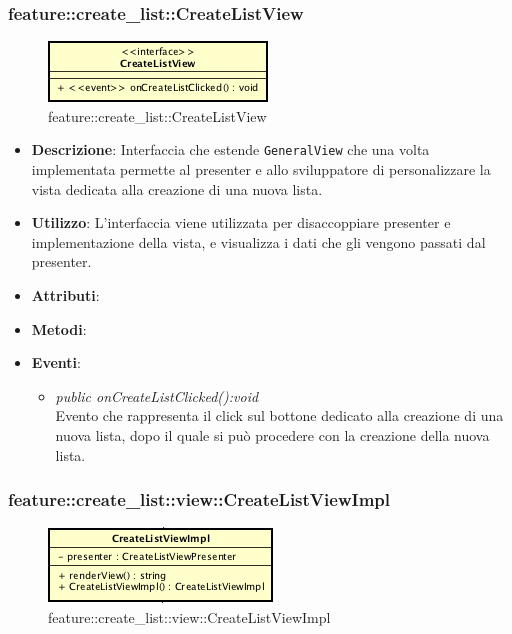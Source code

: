 \subsubsection{feature::create\_list::CreateListView}

\label{feature::create\_list::CreateListView}
\begin{figure}[ht]
	\centering
	\includegraphics[scale=0.5]{Sezioni/SottosezioniST/img/app/CreateListView.png}
	\caption{feature::create\_list::CreateListView}
\end{figure}

\begin{itemize}
\item \textbf{Descrizione}: Interfaccia che estende \texttt{GeneralView} che una volta implementata permette al presenter e allo sviluppatore di personalizzare la vista dedicata alla creazione di una nuova lista.
\item \textbf{Utilizzo}: L'interfaccia viene utilizzata per disaccoppiare presenter e implementazione della vista, e visualizza i dati che gli vengono passati dal presenter.
\item \textbf{Attributi}:
\item \textbf{Metodi}:
\item \textbf{Eventi}:
	\begin{itemize}
	\item \textit{public onCreateListClicked():void}\\
	Evento che rappresenta il click sul bottone dedicato alla creazione di una nuova lista, dopo il quale si può procedere con la creazione della nuova lista.
	\end{itemize}
\end{itemize}

\subsubsection{feature::create\_list::view::CreateListViewImpl}

\label{feature::create\_list::view::CreateListViewImpl}
\begin{figure}[ht]
	\centering
	\includegraphics[scale=0.5]{Sezioni/SottosezioniST/img/app/CreateListViewImpl.png}
	\caption{feature::create\_list::view::CreateListViewImpl}
\end{figure}

